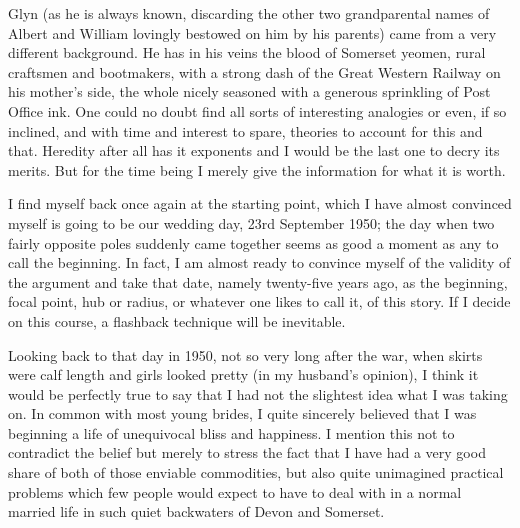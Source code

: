 Glyn (as he is always known, discarding the other two grandparental names of Albert and William lovingly bestowed on him by his parents) came from a very different background. He has in his veins the blood of Somerset yeomen, rural craftsmen and bootmakers, with a strong dash of the Great Western Railway on his mother's side, the whole nicely seasoned with a generous sprinkling of Post Office ink. One could no doubt find all sorts of interesting analogies or even, if so inclined, and with time and interest to spare, theories to account for this and that. Heredity after all has it exponents and I would be the last one to decry its merits. But for the time being I merely give the information for what it is worth.

I find myself back once again at the starting point, which I have almost convinced myself is going to be our wedding day, 23rd September 1950; the day when two fairly opposite poles suddenly came together seems as good a moment as any to call the beginning. In fact, I am almost ready to convince myself of the validity of the argument and take that date, namely twenty-five years ago, as the beginning, focal point, hub or radius, or whatever one likes to call it, of this story. If I decide on this course, a flashback technique will be inevitable.

Looking back to that day in 1950, not so very long after the war, when skirts were calf length and girls looked pretty (in my husband's opinion), I think it would be perfectly true to say that I had not the slightest idea what I was taking on. In common with most young brides, I quite sincerely believed that I was beginning a life of unequivocal bliss and happiness. I mention this not to contradict the belief but merely to stress the fact that I have had a very good share of both of those enviable commodities, but also quite unimagined practical problems which few people would expect to have to deal with in a normal married life in such quiet backwaters of Devon and Somerset. 